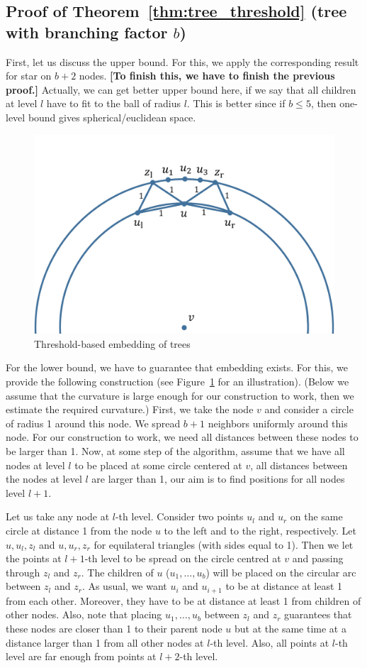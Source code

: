 \documentclass{article} %
\begin{document}
\subsection{Proof of Theorem~\ref{thm:tree_threshold} (tree with branching factor $b$)}

First, let us discuss the upper bound. For this, we apply the corresponding result for star on $b + 2$ nodes. \textbf{[To finish this, we have to finish the previous proof.]} 
Actually, we can get better upper bound here, if we say that all children at level $l$ have to fit to the ball of radius $l$. This is better since if $b \le 5$, then one-level bound gives spherical/euclidean space.

\begin{figure}
    \centering
    \includegraphics[width = 0.5 \textwidth]{trees.pdf}
    \caption{Threshold-based embedding of trees}
    \label{fig:trees}
\end{figure}


For the lower bound, we have to guarantee that embedding exists. For this, we provide the following construction (see Figure~\ref{fig:trees} for an illustration).
(Below we assume that the curvature is large enough for our construction to work, then we estimate the required curvature.)
First, we take the node $v$ and consider a circle of radius 1 around this node. 
We spread $b + 1$ neighbors uniformly around this node. For our construction to work, we need all distances between these nodes to be larger than 1.
Now, at some step of the algorithm, assume that we have all nodes at level $l$ to be placed at some circle centered at $v$, all distances between the nodes at level $l$ are larger than 1, our aim is to find positions for all nodes level $l + 1$. 

Let us take any node at $l$-th level. Consider two points $u_l$ and $u_r$ on the same circle at distance 1 from the node $u$ to the left and to the right, respectively.
Let $u,u_l,z_l$ and $u,u_r,z_r$ for equilateral triangles (with sides equal to 1). Then we let the points at $l+1$-th level to be spread on the circle centred at $v$ and passing through $z_l$ and $z_r$. The children of $u$ ($u_1, \ldots, u_{b}$) will be placed on the circular arc between $z_l$ and $z_r$. As usual, we want $u_i$ and $u_{i+1}$ to be at distance at least 1 from each other. Moreover, they have to be at distance at least 1 from children of other nodes. Also, note that placing $u_1, \ldots, u_{b}$ between $z_l$ and $z_r$ guarantees that these nodes are closer than 1 to their parent node $u$ but at the same time at a distance larger than 1 from all other nodes at $l$-th level. Also, all points at $l$-th level are far enough from points at $l+2$-th level.
\end{document}
